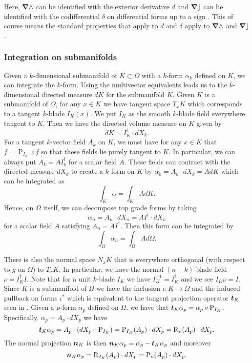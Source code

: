 Here, $\boldsymbol{\nabla} \wedge$ can be identified with the exterior derivative $d$ and $\boldsymbol{\nabla} \rfloor$ can be identified with the codifferential $\delta$ on differential forms up to a sign \cite{schindler_geometric_2020}. This of course means the standard properties that apply to $d$ and $\delta$ apply to $\boldsymbol{\nabla} \wedge$ and $\boldsymbol{\nabla} \rfloor$.


\subsubsection{Integration on submanifolds}

Given a $k$-dimensional submanifold of $K \subset \Omega$ with a $k$-form $\alpha_k$ defined on $K$, we can integrate the $k$-form. Using the multivector equivalents leads us to the $k$-dimensional directed measure $dK$ for the submanifold $K$.  Given $K$ is a submanifold of $\Omega$, for any $x \in K$ we have tangent space $T_x K$ which corresponds to a tangent $k$-blade $I_K(x)$.  We put $I_K$ as the smooth $k$-blade field everywhere tangent to $K$. Then we have the directed volume measure on $K$ given by
\[
dK = I_K^\dagger \cdot dX_k.
\]
For a tangent $k$-vector field $A_k$ on $K$, we must have for any $x \in K$ that $f = \operatorname{P}_{I_K} \circ f$ so that these fields lie purely tangent to $K$. In particular, we can always put $A_k = A I_k^\dagger$ for a scalar field $A$. These fields can contract with the directed measure $dX_k$ to create a $k$-form on $K$ by $\alpha_k = A_k \cdot dX_k = A dK$ which can be integrated as
\[
\int_K \alpha = \int_K A dK.
\]
Hence, on $\Omega$ itself, we can decompose top grade forms by taking
\[
\alpha_n = A_n \cdot dX_n = A I^\dagger \cdot dX_n
\]
for a scalar field $A$ satisfying $A_n = AI^\dagger$. Then this form can be integrated by
\[
\int_\Omega \alpha_n = \int_\Omega A d\Omega.
\]

There is also the normal space $N_x K$ that is everywhere orthogonal (with respect to $g$ on $\Omega$) to $T_x K$.  In particular, we have the normal $(n-k)$-blade field $\nu = I_K^\dagger I$. Note that for a unit $k$-blade $I_K$ we have $I_K^{-1}=I_K^\dagger$ and we see $I_K \nu = I$. Since $K$ is a submanifold of $\Omega$ we have the inclusion $\iota \colon K \to \Omega$ and the induced pullback on forms $\iota^*$ which is equivalent to the tangent projection operator $\boldsymbol{t}_K$ seen in \cite{schwarz_hodge_1995}. Given a $p$-form $\alpha_p$ defined on $\Omega$, we have that $\boldsymbol{t}_K \alpha_p = \alpha_p \circ \operatorname{P}_{I_K}$. Specifically, $\alpha_p = A_p \cdot dX_p$ we have 
\[
\boldsymbol{t}_K \alpha_p  = A_p \cdot (dX_p \circ \operatorname{P}_{I_K}) = \operatorname{P}_{I_K}(A_p) \cdot dX_p = \operatorname{R}_{\nu}(A_p)\cdot dX_p.
\]
The normal projection $\boldsymbol{n}_K$ is then $\boldsymbol{n}_K \alpha_p = \alpha_p - \boldsymbol{t}_K \alpha_p$ and moreover
\[
\boldsymbol{n}_K \alpha_p = \operatorname{R}_{I_K}(A_p)\cdot dX_p = \operatorname{P}_{\nu}(A_p)\cdot dX_p.
\]

